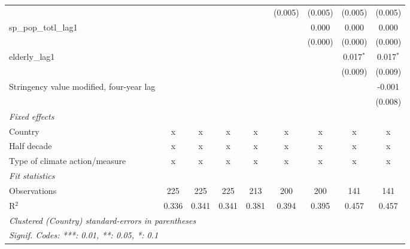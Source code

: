 \begin{tabular}{lcccccccc}
                                                                 &              &              &              &             & (0.005) & (0.005) & (0.005)     & (0.005)\\   
   sp\_pop\_totl\_lag1                                           &              &              &              &             &         & 0.000   & 0.000       & 0.000\\   
                                                                 &              &              &              &             &         & (0.000) & (0.000)     & (0.000)\\   
   elderly\_lag1                                                 &              &              &              &             &         &         & 0.017$^{*}$ & 0.017$^{*}$\\   
                                                                 &              &              &              &             &         &         & (0.009)     & (0.009)\\   
   Stringency value modified, four-year lag                      &              &              &              &             &         &         &             & -0.001\\   
                                                                 &              &              &              &             &         &         &             & (0.008)\\   
   \emph{Fixed effects}\\
   Country                                                       & x            & x            & x            & x           & x       & x       & x           & x\\  
   Half decade                                                   & x            & x            & x            & x           & x       & x       & x           & x\\  
   Type of climate action/measure                                & x            & x            & x            & x           & x       & x       & x           & x\\  
   \midrule \emph{Fit statistics}\\
   Observations                                                  & 225          & 225          & 225          & 213         & 200     & 200     & 141         & 141\\  
   R$^2$                                                         & 0.336        & 0.341        & 0.341        & 0.381       & 0.394   & 0.395   & 0.457       & 0.457\\  
   \midrule
   \multicolumn{9}{l}{\emph{Clustered (Country) standard-errors in parentheses}}\\
   \multicolumn{9}{l}{\emph{Signif. Codes: ***: 0.01, **: 0.05, *: 0.1}}\\
\end{tabular}
\par\endgroup


